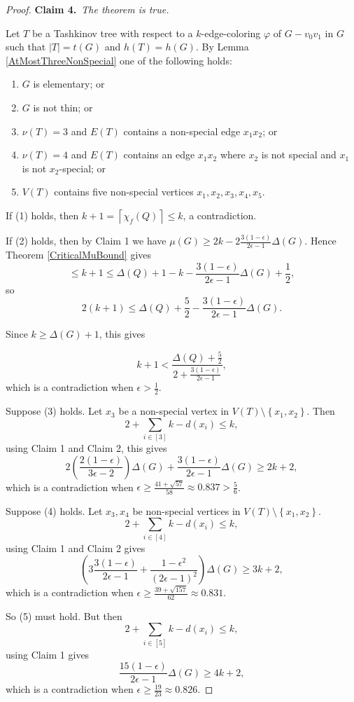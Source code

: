 \documentclass[12pt]{amsart}
\theoremstyle{plain}
\theoremstyle{definition}
\theoremstyle{remark}
\newcommand{\set}[1]{\left\{ #1 \right\}}
\newcommand{\ceil}[1]{\left\lceil#1\right\rceil}
\newcommand{\irange}[1]{\left[#1\right]}
\newcommand{\parens}[1]{\left( #1 \right)}
\newcommand{\vph}{\varphi}
\newcommand{\claim}[2]{{\noindent\bf Claim #1.}~{\it #2}~~}
\begin{document}
\begin{proof}
\claim{4}{The theorem is true.}

Let $T$ be a Tashkinov tree with respect to a $k$-edge-coloring $\vph$ of $G - v_0v_1$ in $G$ such that $|T| = t(G)$ and $h(T) = h(G)$.  By Lemma \ref{AtMostThreeNonSpecial} one of the following holds:
\begin{enumerate}
\item $G$ is elementary; or
\item $G$ is not thin; or
\item $\nu(T) = 3$ and $E(T)$ contains a non-special edge $x_1x_2$; or
\item $\nu(T) = 4$ and $E(T)$ contains an edge $x_1x_2$ where $x_2$ is not special and $x_1$ is not $x_2$-special; or
\item $V(T)$ contains five non-special vertices $x_1, x_2, x_3, x_4, x_5$.
\end{enumerate}

If (1) holds, then $k + 1 = \ceil{\chi_f(Q)} \le k$, a contradiction.

If (2) holds, then by Claim 1 we have $\mu(G) \ge 2k - 2\frac{3(1-\epsilon)}{2\epsilon -1}\Delta(G)$.  Hence Theorem \ref{CriticalMuBound} gives
\[\le k + 1 \le \Delta(Q) + 1 - k - \frac{3(1-\epsilon)}{2\epsilon -1}\Delta(G) + \frac12,\]
so
\[2(k + 1) \le \Delta(Q) + \frac52 - \frac{3(1-\epsilon)}{2\epsilon -1}\Delta(G).\]

Since $k \ge \Delta(G) + 1$, this gives

\[k + 1 < \frac{\Delta(Q) + \frac52}{2 + \frac{3(1-\epsilon)}{2\epsilon -1}},\]
which is a contradiction when $\epsilon > \frac12$.

Suppose (3) holds.  Let $x_3$ be a non-special vertex in $V(T) \setminus \set{x_1,x_2}$. Then
\[2 + \sum_{i \in \irange{3}} k - d(x_i) \le k,\]
using Claim 1 and Claim 2, this gives
\[2\parens{\frac{2(1-\epsilon)}{3\epsilon - 2}}\Delta(G) + \frac{3(1-\epsilon)}{2\epsilon -1}\Delta(G) \ge 2k+2,\]
which is a contradiction when $\epsilon \ge \frac{41 + \sqrt{57}}{58} \approx 0.837 > \frac56$.

Suppose (4) holds.  Let $x_3,x_4$ be non-special vertices in $V(T) \setminus \set{x_1,x_2}$.
\[2 + \sum_{i \in \irange{4}} k - d(x_i) \le k,\]
using Claim 1 and Claim 2 gives
\[\parens{3\frac{3(1-\epsilon)}{2\epsilon -1} + \frac{1 - \epsilon^2}{\parens{2\epsilon - 1}^2}}\Delta(G) \ge 3k+2,\]
which is a contradiction when $\epsilon \ge \frac{39 + \sqrt{157}}{62} \approx 0.831$.

So (5) must hold.  But then
\[2 + \sum_{i \in \irange{5}} k - d(x_i) \le k,\]
using Claim 1 gives
\[\frac{15(1-\epsilon)}{2\epsilon -1}\Delta(G) \ge 4k+2,\]
which is a contradiction when $\epsilon \ge \frac{19}{23} \approx 0.826$.

\end{proof}
\end{document}
